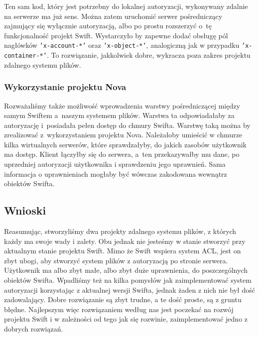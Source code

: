 	Ten sam kod, który jest potrzebny do lokalnej autoryzacji, wykonywany zdalnie na serwerze ma już sens. Można zatem uruchomić serwer pośredniczący zajmujący się wyłącznie autoryzacją, albo po prostu rozszerzyć o~tę funkcjonalność projekt Swift. Wystarczyło by zapewne dodać obsługę pól nagłówków \texttt{'x-account-*'} oraz \texttt{'x-object-*'}, analogiczną jak w przypadku \texttt{'x-container-*'}. To rozwiązanie, jakkolwiek dobre, wykracza poza zakres projektu zdalnego systemu plików.
	
	\subsubsection{Wykorzystanie projektu Nova}\label{sub:wykorzystanie projektu nova}

    Rozważaliśmy także możliwość wprowadzenia warstwy pośredniczącej między samym Swiftem a~naszym systemem plików. Warstwa ta odpowiadałaby za autoryzację i~posiadała pełen dostęp do chmury Swifta. Warstwę taką można by zrealizować z~wykorzystaniem projektu Nova. Należałoby umieścić w chmurze kilka wirtualnych serwerów, które sprawdzałyby, do jakich zasobów użytkownik ma dostęp. Klient łączyłby się do serwera, a~ten przekazywałby mu dane, po uprzedniej autoryzacji użytkownika i sprawdzeniu jego uprawnień. Sama informacja o uprawnieniach mogłaby być wówczas zakodowana wewnątrz obiektów Swifta.
	
	\subsection{Wnioski}\label{sec:wnioski}

	Reasumując, stworzyliśmy dwa projekty zdalnego systemu plików, z których każdy ma swoje wady i zalety. Obu jednak nie jesteśmy w stanie stworzyć przy aktualnym stanie projektu Swift. Mimo że Swift wspiera system ACL, jest on zbyt ubogi, aby stworzyć system plików z autoryzacją po stronie serwera. Użytkownik ma albo zbyt małe, albo zbyt duże uprawnienia, do poszczególnych obiektów Swifta. Wpadliśmy też na kilka pomysłów jak zaimplementować system autoryzacji korzystając z aktualnej wersji Swifta, jednak żaden z nich nie był dość zadowalający. Dobre rozwiązanie są zbyt trudne, a te dość proste, są z gruntu błędne. Najlepszym więc rozwiązaniem według nas jest poczekać na rozwój projektu Swift i w zależności od tego jak się rozwinie, zaimplementować jedno z dobrych rozwiązań.
